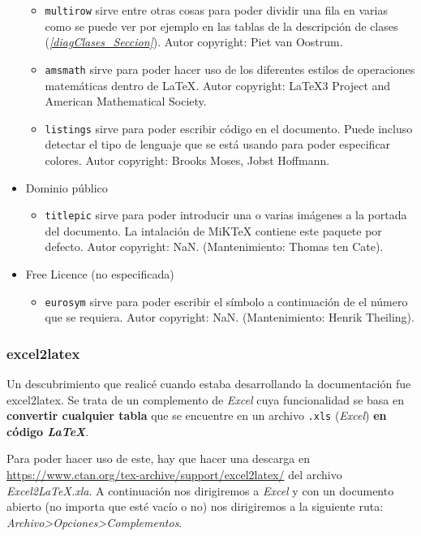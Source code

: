 \begin{itemize}
\begin{itemize}
		\item \texttt{multirow} sirve entre otras cosas para poder dividir una fila en varias como se puede ver por ejemplo en las tablas de la descripción de clases (\textit{\ref{diagClases_Seccion}}). Autor copyright: Piet van Oostrum.
		\item \texttt{amsmath} sirve para poder hacer uso de los diferentes estilos de operaciones matemáticas dentro de LaTeX. Autor copyright: LaTeX3 Project and Amer­i­can Math­e­mat­i­cal So­ci­ety.
		\item \texttt{listings} sirve para poder escribir código en el documento. Puede incluso detectar el tipo de lenguaje que se está usando para poder especificar colores. Autor copyright: Brooks Moses, Jobst Hoff­mann.
	\end{itemize}
	\item Dominio público
	\begin{itemize}
		\item \texttt{titlepic} sirve para poder introducir una o varias imágenes a la portada del documento. La intalación de MiKTeX contiene este paquete por defecto. Autor copyright: NaN. (Mantenimiento: Thomas ten Cate).
	\end{itemize}
	\item Free Licence (no especificada)
	\begin{itemize}
		\item \texttt{eurosym} sirve para poder escribir el símbolo \EUR{} a continuación de el número que se requiera. Autor copyright: NaN. (Mantenimiento: Hen­rik Theil­ing).
	\end{itemize}
\end{itemize}

\subsubsection*{excel2latex}
Un descubrimiento que realicé cuando estaba desarrollando la documentación fue excel2latex. Se trata de un complemento de \textit{Excel} cuya funcionalidad se basa en \textbf{convertir cualquier tabla} que se encuentre en un archivo \texttt{.xls} (\textit{Excel}) \textbf{en código \textit{LaTeX}}.\newline

Para poder hacer uso de este, hay que hacer una descarga en \url{https://www.ctan.org/tex-archive/support/excel2latex/} del archivo \textit{Excel2LaTeX.xla}. A continuación nos dirigiremos a \textit{Excel} y con un documento abierto (no importa que esté vacío o no) nos dirigiremos a la siguiente ruta: \textit{Archivo\textgreater Opciones\textgreater Complementos}.\newline

